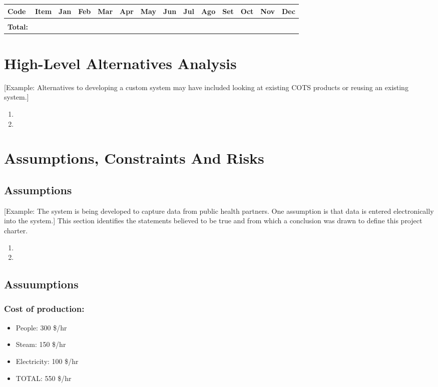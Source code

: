 \documentclass[11pt]{article}
\begin{document}
\begin{center}
\begin{tabular}{llllllllllllll}
Code & Item & Jan & Feb & Mar & Apr & May & Jun & Jul & Ago & Set & Oct & Nov & Dec\\
\hline
 &  &  &  &  &  &  &  &  &  &  &  &  & \\
\hline
\textbf{Total:} &  &  &  &  &  &  &  &  &  &  &  &  & \\
\end{tabular}
\end{center}

\section{High-Level Alternatives Analysis}
\label{sec:org34decf6}
[Example: Alternatives to developing a custom system may have included looking at existing COTS products or reusing an existing system.]
\begin{enumerate}
\item{}
\item{}
\end{enumerate}
\section{Assumptions, Constraints And Risks}
\label{sec:orgaebefa3}
\subsection{Assumptions}
\label{sec:org18a7aa1}
[Example: The system is being developed to capture data from public health partners. One assumption is that data is entered electronically into the system.]  
This section identifies the statements believed to be true and from which a conclusion was drawn to define this project charter. 
\begin{enumerate}
\item{}
\item{}
\end{enumerate}

\subsection{Assuumptions}
\label{sec:org407e156}
\subsubsection{Cost of production:}
\label{sec:orgab53604}
\begin{itemize}
\item People: 		300 \$/hr
\item Steam: 		150 \$/hr
\item Electricity: 	100 \$/hr
\item TOTAL:		550 \$/hr
\end{itemize}
\end{document}
